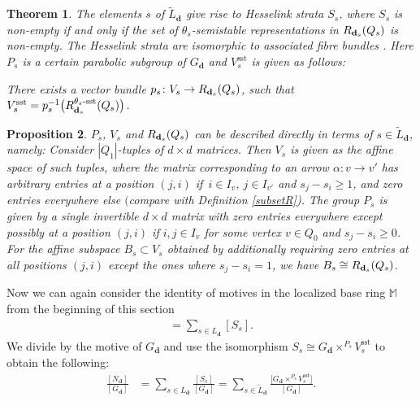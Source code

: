 \documentclass[10pt,a4paper]{amsart}
\numberwithin{equation}{section}
\newtheorem{Theorem}{Theorem}[section]
\newtheorem{Proposition}[Theorem]{Proposition}
\theoremstyle{definition}
\begin{document}
\begin{Theorem} \label{theo LB}
The elements $s$ of $\widetilde{L}_{\mathbf{d}}$ give rise to Hesselink strata $S_s$, where $S_s$ is non-empty if and only if the set of $\theta_{s}$-semistable representations in $R_{{\bf d}_s}(Q_s)$ is non-empty.
The Hesselink strata are isomorphic to associated fibre bundles
.
Here $P_s$ is a certain parabolic subgroup of $G_{\mathbf{d}}$ and $V_s^{\mathrm{sst}}$ is given as follows:

There exists a vector bundle
$
p_s\colon V_s \rightarrow R_{{\bf d}_s} (Q_s)$,
such that
$
V_s^{\mathrm{sst}} = p_s^{-1} \bigl(R_{{\bf d}_s}^{\theta_s\text{\rm -sst}}(Q_s)\bigr)$.
\end{Theorem}

\begin{Proposition} \label{prop LB}
$P_s$, $V_s$ and $R_{{\bf d}_s}(Q_s)$ can be described directly in terms of $s \in \widetilde{L}_{\mathbf{d}}$, namely:
Consider $|Q_1|$-tuples of $d \times d$ matrices. Then $V_s$ is given as the affine space of such tuples, where the matrix corresponding to an arrow $\alpha\colon v\rightarrow v'$ has arbitrary entries at a position $(j,i)$ if~${i\in I_v}$, $j\in I_{v'}$ and $s_j - s_i \geq 1$, and zero entries everywhere else $($compare with Definition {\rm\ref{subsetR})}. The group $P_s$ is given by a single invertible $d \times d$ matrix with zero entries everywhere except possibly at a position $(j,i)$ if $i,j\in I_v$ for some vertex $v\in Q_0$ and $s_j - s_i \geq 0$. For the affine subspace $B_s\subset V_s$ obtained by additionally requiring zero entries at all positions $(j,i)$ except the ones where $s_j - s_i = 1$, we have $B_s \cong R_{{\bf d}_s}(Q_s)$.
\end{Proposition}

Now we can again consider the identity of motives in the localized base ring $\mathbb{M}$ from the beginning of this section
\begin{align*}
[N_{\mathbf{d}}] = \sum_{s \in L_{\mathbf{d}}} [S_s] .
\end{align*}
We divide by the motive of $G_ {\mathbf{d}}$ and use the isomorphism $S_s \cong G_{\mathbf{d}} \times^{P_s} V_s^{\mathrm{sst}}$ to obtain the following:
\begin{align*}
\frac{[ N_{\mathbf{d}}]}{[ G_{\mathbf{d}}]}
&= \sum_{s \in L_{\mathbf{d}}} \frac{[S_s]}{[G_{\mathbf{d}}]}
= \sum_{s \in \widetilde{L}_{\mathbf{d}}} \frac{\big[G_{\mathbf{d}} \times^{P_s} V_s^{\mathrm{sst}}\big]}{[G_{\mathbf{d}}]} .
\end{align*}
\end{document}
